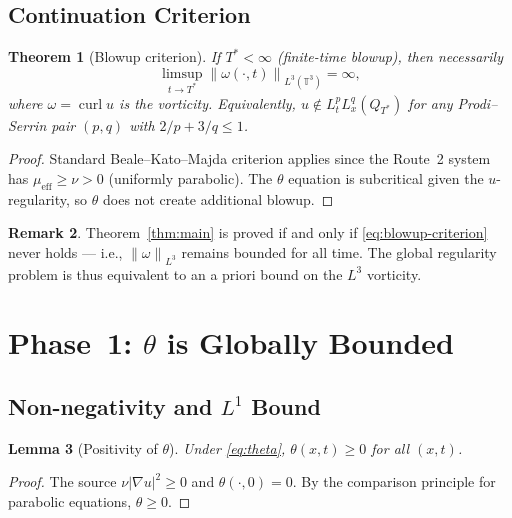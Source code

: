 \documentclass[11pt]{article}
\newtheorem{theorem}{Theorem}[section]
\newtheorem{lemma}[theorem]{Lemma}
\theoremstyle{definition}
\newtheorem{remark}[theorem]{Remark}
\theoremstyle{remark}
\newcommand{\T}{\mathbb{T}}
\newcommand{\norm}[1]{\left\|#1\right\|}
\newcommand{\grad}{\nabla}
\newcommand{\curl}{\operatorname{curl}}
\newcommand{\mueff}{\mu_{\mathrm{eff}}}
\begin{document}
\subsection{Continuation Criterion}

\begin{theorem}[Blowup criterion]\label{thm:blowup}
  If $T^*<\infty$ (finite-time blowup), then necessarily
  \begin{equation}\label{eq:blowup-criterion}
    \limsup_{t\to T^*} \norm{\omega(\cdot,t)}_{L^3(\T^3)} = \infty,
  \end{equation}
  where $\omega=\curl u$ is the vorticity.  Equivalently, $u\notin L^p_t L^q_x(Q_{T^*})$
  for any Prodi--Serrin pair $(p,q)$ with $2/p+3/q\leq 1$.
\end{theorem}

\begin{proof}
  Standard Beale--Kato--Majda criterion \cite{BKM1984} applies since the
  Route~2 system has $\mueff\geq\nu>0$ (uniformly parabolic).  The $\theta$
  equation is subcritical given the $u$-regularity, so $\theta$ does not
  create additional blowup.
\end{proof}

\begin{remark}
  Theorem~\ref{thm:main} is proved if and only if \eqref{eq:blowup-criterion}
  never holds — i.e., $\norm{\omega}_{L^3}$ remains bounded for all time.
  The global regularity problem is thus equivalent to an a priori bound on
  the $L^3$ vorticity.
\end{remark}

\section{Phase~1: $\theta$ is Globally Bounded}
\label{sec:phase1}

\subsection{Non-negativity and $L^1$ Bound}

\begin{lemma}[Positivity of $\theta$]\label{lem:theta-pos}
  Under \eqref{eq:theta}, $\theta(x,t)\geq 0$ for all $(x,t)$.
\end{lemma}

\begin{proof}
  The source $\nu|\grad u|^2\geq 0$ and $\theta(\cdot,0)=0$.  By the
  comparison principle for parabolic equations, $\theta\geq 0$.
\end{proof}
\end{document}
